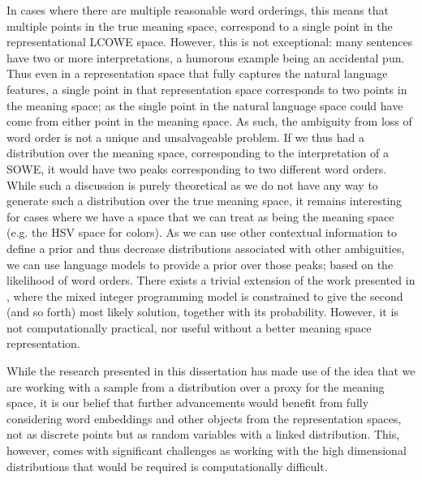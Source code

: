 \documentclass{book}
\begin{document}
In cases where there are multiple reasonable word orderings,
this means that multiple points in the true meaning space, correspond to a single point in the representational LCOWE space.
However, this is not exceptional: 
many sentences have two or more interpretations, a humorous example being an accidental pun.
Thus even in a representation space that fully captures the natural language features,  a single point in that representation space
corresponds to two points in the meaning space;
as the single point in the natural language space could have come from either point in the meaning space.
As such, the ambiguity from loss of word order is not a unique and unsalvageable problem.
If we thus had a distribution over the meaning space, corresponding to the interpretation of a SOWE, it would have two peaks corresponding to two different word orders.
While such a discussion is purely theoretical as we do not have any way to generate such a distribution over the true meaning space,
it remains interesting for cases where we have a space that we can treat as being the meaning space (e.g. the HSV space for colors).
As we can use other contextual information to define a prior and thus decrease distributions associated with other ambiguities,
we can use language models to provide a prior over those peaks; based on the likelihood of word orders.
There exists a trivial extension of the work presented in , where the mixed integer programming model is constrained to give the second (and so forth) most likely solution, together with its probability.
However, it is not computationally practical, nor useful without a better meaning space representation.


While the research presented in this dissertation has made use of the idea that we are working with a sample from a distribution over a proxy for the meaning space,
it is our belief that further advancements would benefit from fully considering
word embeddings and other objects from the representation spaces, not as discrete points but as random variables with a linked distribution.
This, however, comes with significant challenges as working with the high dimensional distributions that would be required is computationally difficult.
\end{document}
